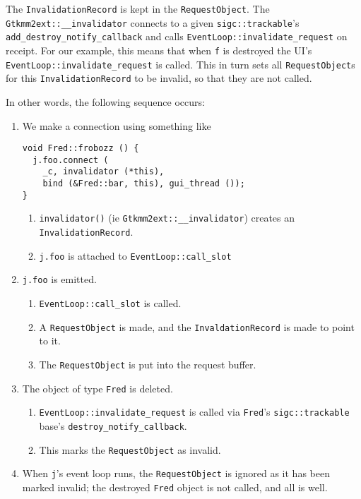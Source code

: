 \documentclass[10pt,a4paper]{book}
\newcommand{\code}[1]{\texttt{#1}}
\begin{document}
The \code{InvalidationRecord} is kept in the \code{RequestObject}.
The \code{Gtkmm2ext::\_\_invalidator} connects to a given
\code{sigc::trackable}'s \code{add\_destroy\_notify\_callback} and
calls \code{EventLoop::invalidate\_request} on receipt.  For our
example, this means that when \code{f} is destroyed the UI's
\code{EventLoop::invalidate\_request} is called.  This in turn sets
all \code{RequestObject}s for this \code{InvalidationRecord} to be
invalid, so that they are not called.

In other words, the following sequence occurs:
\begin{enumerate}

\item We make a connection using something like
\begin{lstlisting}
void Fred::frobozz () {
  j.foo.connect (
    _c, invalidator (*this),
    bind (&Fred::bar, this), gui_thread ());
}
\end{lstlisting}
\begin{enumerate}
\item \code{invalidator()} (ie \code{Gtkmm2ext::\_\_invalidator}) creates an \code{InvalidationRecord}.
\item \code{j.foo} is attached to \code{EventLoop::call\_slot}
\end{enumerate}

\item \code{j.foo} is emitted.
\begin{enumerate}
\item \code{EventLoop::call\_slot} is called.
\item A \code{RequestObject} is made, and the \code{InvaldationRecord} is made to point to it.
\item The \code{RequestObject} is put into the request buffer.
\end{enumerate}

\item The object of type \code{Fred} is deleted.
\begin{enumerate}
\item \code{EventLoop::invalidate\_request} is called via \code{Fred}'s \code{sigc::trackable} base's \code{destroy\_notify\_callback}.
\item This marks the \code{RequestObject} as invalid.
\end{enumerate}

\item When \code{j}'s event loop runs, the \code{RequestObject} is
  ignored as it has been marked invalid; the destroyed \code{Fred}
  object is not called, and all is well.

\end{enumerate}
\end{document}
